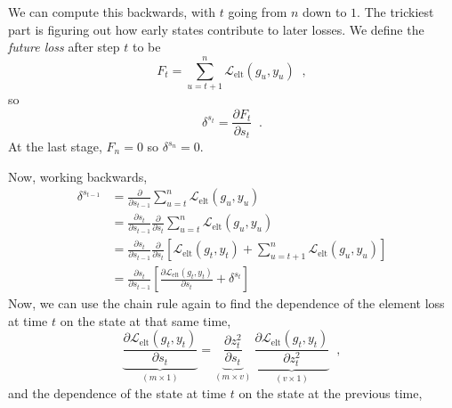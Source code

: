 \begin{enumerate}[(1)]
        We can compute this backwards, with $t$ going from $n$ down to $1$.
        The trickiest part is figuring out how early states contribute to later
        losses. We define the {\it{future loss}} after step $t$ to be
        \begin{equation}
          F_t = \sum_{u = t + 1}^{n}\mathcal{L}_\text{elt}(g_u, y_u) \;\;,
        \end{equation}
        so
        \begin{equation}
          \delta^{s_t} = \frac{\partial F_t}{\partial s_t}\;\;.
        \end{equation}
        At the last stage, $F_n = 0$ so $\delta^{s_n} = 0$.

        Now, working backwards,
        \begin{align}
          \delta^{s_{t -1}} & = \frac{\partial}{\partial s_{t - 1}}\sum_{u = t}^n\mathcal{L}_\text{elt}(g_u, y_u)                                                                                       \\
                            & = \frac{\partial s_t}{\partial s_{t - 1}} \frac{\partial}{\partial s_t}\sum_{u = t}^n\mathcal{L}_\text{elt}(g_u, y_u)                                                     \\
                            & = \frac{\partial s_t}{\partial s_{t - 1}} \frac{\partial}{\partial s_t}\left[\mathcal{L}_\text{elt}(g_t, y_t) + \sum_{u = t + 1}^n\mathcal{L}_\text{elt}(g_u, y_u)\right] \\
                            & = \frac{\partial s_t}{\partial s_{t - 1}} \left[\frac{\partial \mathcal{L}_\text{elt}(g_t, y_t)}{\partial s_t} + \delta^{s_t}\right]
        \end{align}
        Now, we can use the chain rule again to find the dependence of the
        element loss at time $t$ on the state  at that same time,
        \begin{equation}
          \underbrace{\frac{\partial \mathcal{L}_\text{elt}(g_t,
              y_t)}{\partial s_t}}_{(m \times 1)} = \underbrace{\frac{\partial
              z_t^2}{\partial s_t}}_{(m \times v)} ~
          \underbrace{\frac{\partial \mathcal{L}_\text{elt}(g_t, y_t)}{\partial
              z_t^2}}_{(v \times 1)}\;\;,
        \end{equation}
        and the dependence of the state at time $t$ on the state at the
        previous  time,

\end{enumerate}
